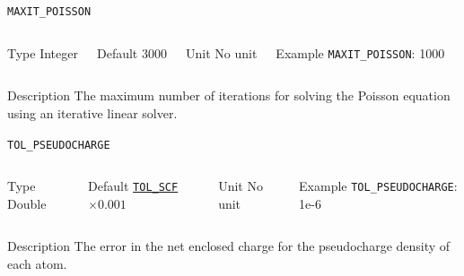 \begin{frame}[allowframebreaks]{\texttt{MAXIT\_POISSON}} \label{MAXIT_POISSON}
\vspace*{-12pt}
\begin{columns}
\begin{block}{Type}
Integer
\end{block}

\begin{block}{Default}
$3000$
\end{block}

\begin{block}{Unit}
No unit
\end{block}

\begin{block}{Example}
\texttt{MAXIT\_POISSON}: 1000
\end{block}
\end{columns}

\begin{block}{Description}
The maximum number of iterations for solving the Poisson equation using an iterative linear solver.
\end{block}

\end{frame}


\begin{frame}[allowframebreaks]{\texttt{TOL\_PSEUDOCHARGE}} \label{TOL_PSEUDOCHARGE}
\vspace*{-12pt}
\begin{columns}
\begin{block}{Type}
Double
\end{block}

\begin{block}{Default}
\hyperlink{TOL_SCF}{\texttt{TOL\_SCF}}$\times 0.001$
\end{block}

\begin{block}{Unit}
No unit
\end{block}

\begin{block}{Example}
\texttt{TOL\_PSEUDOCHARGE}: 1e-6
\end{block}
\end{columns}

\begin{block}{Description}
The error in the net enclosed charge for the pseudocharge density of each atom.
\end{block}

\end{frame}




